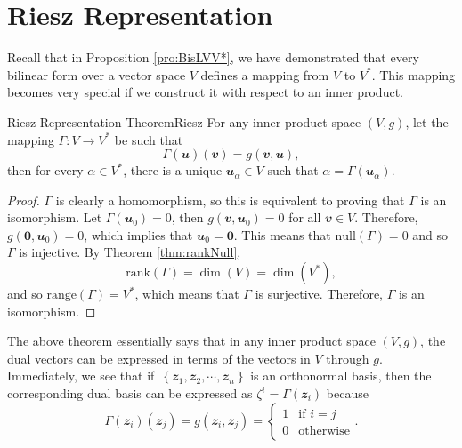 \documentclass[math]{amznotes}
\theoremstyle{remark}
\newcommand{\zero}{\mathbf{0}}
\begin{document}
    \section{Riesz Representation}
    Recall that in Proposition \ref{pro:BisLVV*}, we have demonstrated that every bilinear form over a vector space $V$ defines a mapping from $V$ to $V^*$. This mapping becomes very special if we construct it with respect to an inner product.
    \begin{thmbox}{Riesz Representation Theorem}{Riesz}
        For any inner product space $(V, g)$, let the mapping $\Gamma \colon V \to V^*$ be such that
        \begin{equation*}
            \Gamma(\mathbfit{u})(\mathbfit{v}) = g(\mathbfit{v}, \mathbfit{u}),
        \end{equation*}
        then for every $\alpha \in V^*$, there is a unique $\mathbfit{u}_{\alpha} \in V$ such that $\alpha = \Gamma\left(\mathbfit{u}_{\alpha}\right)$.
        \tcblower
        \begin{proof}
            $\Gamma$ is clearly a homomorphism, so this is equivalent to proving that $\Gamma$ is an isomorphism. Let $\Gamma(\mathbfit{u}_0) = 0$, then $g(\mathbfit{v}, \mathbfit{u}_0) = 0$ for all $\mathbfit{v} \in V$. Therefore, $g(\zero, \mathbfit{u}_0) = 0$, which implies that $\mathbfit{u}_0 = \zero$. This means that $\mathrm{null}(\Gamma) = 0$ and so $\Gamma$ is injective. By Theorem \ref{thm:rankNull}, 
            \begin{equation*}
                \mathrm{rank}(\Gamma) = \dim(V) = \dim\left(V^*\right),
            \end{equation*}
            and so $\mathrm{range}(\Gamma) = V^*$, which means that $\Gamma$ is surjective. Therefore, $\Gamma$ is an isomorphism.
        \end{proof}
    \end{thmbox}
    The above theorem essentially says that in any inner product space $(V, g)$, the dual vectors can be expressed in terms of the vectors in $V$ through $g$. Immediately, we see that if~$\left\{\mathbfit{z}_1, \mathbfit{z}_2, \cdots, \mathbfit{z}_n\right\}$ is an orthonormal basis, then the corresponding dual basis can be expressed as $\zeta^i = \Gamma\left(\mathbfit{z}_i\right)$ because 
    \begin{equation*}
        \Gamma\left(\mathbfit{z}_i\right)\left(\mathbfit{z}_j\right) = g\left(\mathbfit{z}_i, \mathbfit{z}_j\right) = \begin{cases}
            1 & \textrm{if } i = j \\
            0 & \textrm{otherwise}
        \end{cases}.
    \end{equation*}
\end{document}
